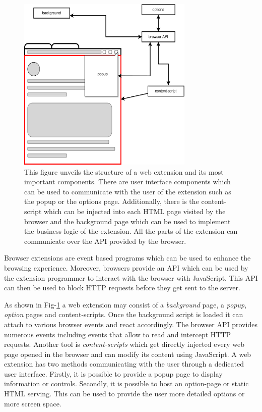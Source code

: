 \begin{figure}[ht!]
  \begin{center}
    \includegraphics[width=0.75\textwidth]{images/ExtensionOverview.png}
  \end{center}
  \caption{This figure unveils the structure of a web extension and its most important components. There are user interface components which 
  can be used to communicate with the user of the extension such as the popup or the options page. Additionally, there is the content-script
which can be injected into each HTML page visited by the browser and the background page which can be used to implement the business logic of the extension. All the parts of the 
extension can communicate over the API provided by the browser.}
  \label{fig:extOver}
\end{figure}

Browser extensions are event based programs which can be used to enhance the browsing
experience. Moreover, browsers provide an API which can be used by the extension programmer to interact with the browser with JavaScript.
This API can then be used to block HTTP requests before they get sent to the server.

As shown in Fig-\ref{fig:extOver} a web extension may consist of a \emph{background} page, a \emph{popup}, \emph{option} pages and
content-scripts. Once the background script is loaded it can attach to various browser events and react accordingly. The browser API
provides numerous events \cite{browserApi} including events that allow to read and intercept HTTP requests. Another tool is  
\emph{content-scripts} which get directly injected every web page opened in the browser and can modify its content using
JavaScript. A web extension has two methods communicating with the user through a dedicated user interface. Firstly, it is possible
to provide a popup page to display information or controls. Secondly, it is possible to host an option-page or static HTML serving. This can
be used to provide the user more detailed options or more screen space.


